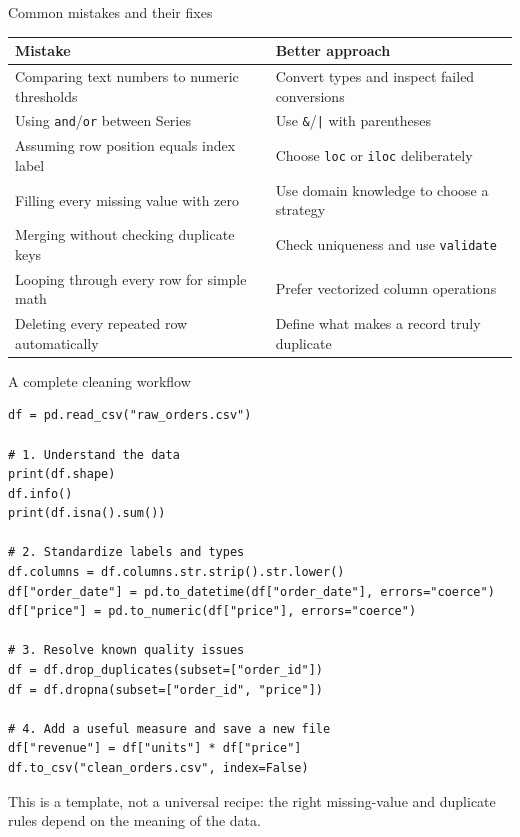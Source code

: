 \documentclass[aspectratio=169,10pt]{beamer}
\begin{document}
\begin{frame}[fragile]{Common mistakes and their fixes}
\begin{tabular}{p{}p{}}
\toprule
\textbf{Mistake} & \textbf{Better approach}\\
\midrule
Comparing text numbers to numeric thresholds & Convert types and inspect failed conversions\\
Using \texttt{and}/\texttt{or} between Series & Use \texttt{\&}/\texttt{|} with parentheses\\
Assuming row position equals index label & Choose \texttt{loc} or \texttt{iloc} deliberately\\
Filling every missing value with zero & Use domain knowledge to choose a strategy\\
Merging without checking duplicate keys & Check uniqueness and use \texttt{validate}\\
Looping through every row for simple math & Prefer vectorized column operations\\
Deleting every repeated row automatically & Define what makes a record truly duplicate\\
\bottomrule
\end{tabular}
\end{frame}

\begin{frame}[fragile]{A complete cleaning workflow}
\begin{lstlisting}
df = pd.read_csv("raw_orders.csv")

# 1. Understand the data
print(df.shape)
df.info()
print(df.isna().sum())

# 2. Standardize labels and types
df.columns = df.columns.str.strip().str.lower()
df["order_date"] = pd.to_datetime(df["order_date"], errors="coerce")
df["price"] = pd.to_numeric(df["price"], errors="coerce")

# 3. Resolve known quality issues
df = df.drop_duplicates(subset=["order_id"])
df = df.dropna(subset=["order_id", "price"])

# 4. Add a useful measure and save a new file
df["revenue"] = df["units"] * df["price"]
df.to_csv("clean_orders.csv", index=False)
\end{lstlisting}
\small This is a template, not a universal recipe: the right missing-value and duplicate rules depend on the meaning of the data.
\end{frame}
\end{document}
